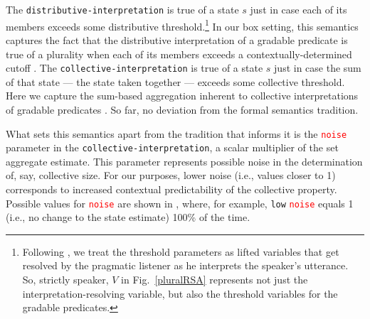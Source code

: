 \documentclass[linguex]{sp}
\begin{document}
The \texttt{distributive-interpretation} is true of a state $s$ just in case each of its members exceeds some distributive threshold.\footnote{Following \cite{lassitergoodman2013}, we treat the threshold parameters as lifted variables that get resolved by the pragmatic listener as he interprets the speaker's utterance. So, strictly speaker, $V$ in Fig.~\ref{pluralRSA} represents not just the interpretation-resolving variable, but also the threshold variables for the gradable predicates.} In our box setting, this semantics captures the fact that the distributive interpretation of a gradable predicate is true of a plurality when each of its members exceeds a contextually-determined cutoff \citep{kennedy1999,lassitergoodman2013}. The \texttt{collective-interpretation} is true of a state $s$ just in case the sum of that state --- the state taken together --- exceeds some collective threshold. Here we capture the sum-based aggregation inherent to collective interpretations of gradable predicates \citep{scha1984}. So far, no deviation from the formal semantics tradition.

What sets this semantics apart from the tradition that informs it is the \textcolor{red}{\texttt{noise}} parameter in the \texttt{collective-interpretation}, a scalar multiplier of the set aggregate estimate. This parameter represents possible noise in the determination of, say, collective size. For our purposes, lower noise (i.e., values closer to 1) corresponds to increased contextual predictability of the collective property. Possible values for \textcolor{red}{\texttt{noise}} are shown in \Next, where, for example, \texttt{low} \textcolor{red}{\texttt{noise}} equals 1 (i.e., no change to the state estimate) 100\% of the time.
\end{document}
